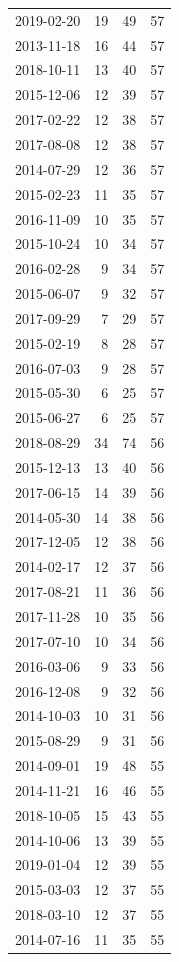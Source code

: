 \begin{tabular}{lrrr}
2019-02-20 & 19 & 49 & 57 \\
2013-11-18 & 16 & 44 & 57 \\
2018-10-11 & 13 & 40 & 57 \\
2015-12-06 & 12 & 39 & 57 \\
2017-02-22 & 12 & 38 & 57 \\
2017-08-08 & 12 & 38 & 57 \\
2014-07-29 & 12 & 36 & 57 \\
2015-02-23 & 11 & 35 & 57 \\
2016-11-09 & 10 & 35 & 57 \\
2015-10-24 & 10 & 34 & 57 \\
2016-02-28 & 9 & 34 & 57 \\
2015-06-07 & 9 & 32 & 57 \\
2017-09-29 & 7 & 29 & 57 \\
2015-02-19 & 8 & 28 & 57 \\
2016-07-03 & 9 & 28 & 57 \\
2015-05-30 & 6 & 25 & 57 \\
2015-06-27 & 6 & 25 & 57 \\
2018-08-29 & 34 & 74 & 56 \\
2015-12-13 & 13 & 40 & 56 \\
2017-06-15 & 14 & 39 & 56 \\
2014-05-30 & 14 & 38 & 56 \\
2017-12-05 & 12 & 38 & 56 \\
2014-02-17 & 12 & 37 & 56 \\
2017-08-21 & 11 & 36 & 56 \\
2017-11-28 & 10 & 35 & 56 \\
2017-07-10 & 10 & 34 & 56 \\
2016-03-06 & 9 & 33 & 56 \\
2016-12-08 & 9 & 32 & 56 \\
2014-10-03 & 10 & 31 & 56 \\
2015-08-29 & 9 & 31 & 56 \\
2014-09-01 & 19 & 48 & 55 \\
2014-11-21 & 16 & 46 & 55 \\
2018-10-05 & 15 & 43 & 55 \\
2014-10-06 & 13 & 39 & 55 \\
2019-01-04 & 12 & 39 & 55 \\
2015-03-03 & 12 & 37 & 55 \\
2018-03-10 & 12 & 37 & 55 \\
2014-07-16 & 11 & 35 & 55 \\

\end{tabular}

